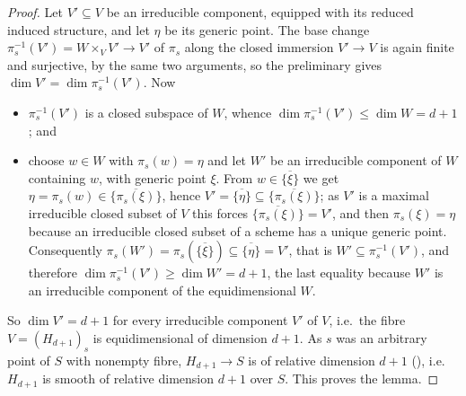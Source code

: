 \begin{proof}
Let $V'\subseteq V$ be an irreducible component, equipped with its
reduced induced structure, and let $\eta$ be its generic point.  The
base change $\pi_s^{-1}(V')=W\times_VV'\to V'$ of $\pi_s$ along the
closed immersion $V'\to V$ is again finite and surjective, by the same
two arguments, so the preliminary gives
$\dim V'=\dim\pi_s^{-1}(V')$.  Now
\begin{itemize}
\item $\pi_s^{-1}(V')$ is a closed subspace of $W$, whence
$\dim\pi_s^{-1}(V')\leq\dim W=d+1$; and
\item choose $w\in W$ with $\pi_s(w)=\eta$ and let $W'$ be an
irreducible component of $W$ containing $w$, with generic point $\xi$.
From $w\in\overline{\{\xi\}}$ we get
$\eta=\pi_s(w)\in\overline{\{\pi_s(\xi)\}}$, hence
$V'=\overline{\{\eta\}}\subseteq\overline{\{\pi_s(\xi)\}}$; as $V'$ is a
maximal irreducible closed subset of $V$ this forces
$\overline{\{\pi_s(\xi)\}}=V'$, and then $\pi_s(\xi)=\eta$ because an
irreducible closed subset of a scheme has a unique generic point.
Consequently
$\pi_s(W')=\pi_s(\overline{\{\xi\}})\subseteq\overline{\{\eta\}}=V'$,
that is $W'\subseteq\pi_s^{-1}(V')$, and therefore
$\dim\pi_s^{-1}(V')\geq\dim W'=d+1$, the last equality because $W'$ is
an irreducible component of the equidimensional $W$.
\end{itemize}
So $\dim V'=d+1$ for every irreducible component $V'$ of $V$, i.e.\ the
fibre $V=(H_{d+1})_s$ is equidimensional of dimension $d+1$.  As $s$ was
an arbitrary point of $S$ with nonempty fibre, $H_{d+1}\to S$ is of
relative dimension $d+1$ (), i.e.\ $H_{d+1}$ is
smooth of relative dimension $d+1$ over $S$.  This proves the lemma.
\end{proof}


